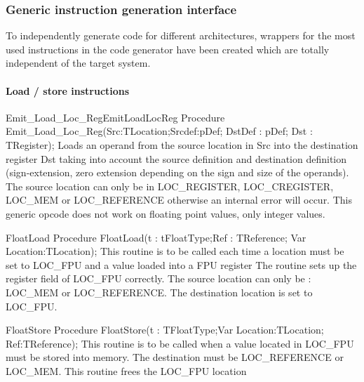 \documentclass [a4paper,12pt]{article}
\begin{document}
\subsubsection{Generic instruction generation interface}
\label{subsubsec:generic}

To independently generate code for different architectures, wrappers for the
most used instructions in the code generator have been created which are
totally independent of the target system.

\paragraph{Load / store instructions}

\begin{procedurel}{Emit\_Load\_Loc\_Reg}{EmitLoadLocReg}
\Declaration
Procedure Emit{\_}Load{\_}Loc{\_}Reg(Src:TLocation;Srcdef:pDef; DstDef : pDef; Dst : TRegister);
\Description
Loads an operand from the source location in \textsf{Src} into the
destination register \textsf{Dst} taking into account the source definition
and destination definition (sign-extension, zero extension depending on the
sign and size of the operands).
\Notes
The source location can only be in LOC{\_}REGISTER, LOC{\_}CREGISTER,
LOC{\_}MEM or LOC{\_}REFERENCE otherwise an internal error will occur. This
generic opcode does not work on floating point values, only integer values.
\end{procedurel}

\begin{procedure}{FloatLoad}
\Declaration
Procedure FloatLoad(t : tFloatType;Ref : TReference; Var Location:TLocation);
\Description
This routine is to be called each time a location must be set to LOC{\_}FPU
and a value loaded into a FPU register
\Notes
The routine sets up the register field of LOC{\_}FPU correctly. The source
location can only be : LOC{\_}MEM or LOC{\_}REFERENCE. The destination
location is set to LOC{\_}FPU.
\end{procedure}

\begin{function}{FloatStore}
\Declaration
Procedure FloatStore(t : TFloatType;Var Location:TLocation; Ref:TReference);
\Description
This routine is to be called when a value located in LOC{\_}FPU must be
stored into memory.
\Notes
The destination must be LOC{\_}REFERENCE or LOC{\_}MEM. This routine frees
the LOC{\_}FPU location \\
\end{function}
\end{document}
